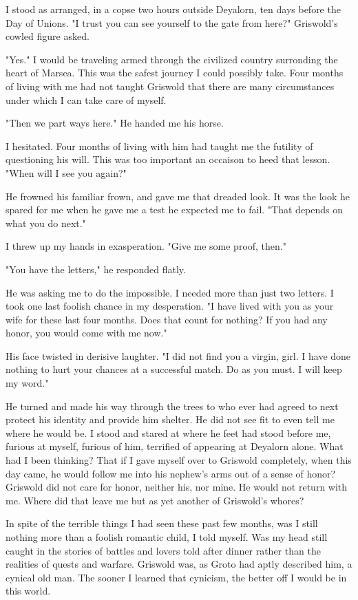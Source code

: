 \documentclass{article}
\begin{document}
I stood as arranged, in a copse two hours outside Deyalorn, ten days before the Day of Unions. "I trust you can see yourself to the gate from here?" Griswold's cowled figure asked.

"Yes." I would be traveling armed through the civilized country surronding the heart of Marsea. This was the safest journey I could possibly take. Four months of living with me had not taught Griswold that there are many circumstances under which I can take care of myself.

"Then we part ways here." He handed me his horse.

I hesitated. Four months of living with him had taught me the futility of questioning his will. This was too important an occaison to heed that lesson. "When will I see you again?"

He frowned his familiar frown, and gave me that dreaded look. It was the look he spared for me when he gave me a test he expected me to fail. "That depends on what you do next."

I threw up my hands in exasperation. "Give me some proof, then."

"You have the letters," he responded flatly.

He was asking me to do the impossible. I needed more than just two letters. I took one last foolish chance in my desperation. "I have lived with you as your wife for these last four months. Does that count for nothing? If you had any honor, you would come with me now."

His face twisted in derisive laughter. "I did not find you a virgin, girl. I have done nothing to hurt your chances at a successful match. Do as you must. I will keep my word."

He turned and made his way through the trees to who ever had agreed to next protect his identity and provide him shelter. He did not see fit to even tell me where he would be. I stood and stared at where he feet had stood before me, furious at myself, furious of him, terrified of appearing at Deyalorn alone. What had I been thinking? That if I gave myself over to Griswold completely, when this day came, he would follow me into his nephew's arms out of a sense of honor? Griswold did not care for honor, neither his, nor mine. He would not return with me. Where did that leave me but as yet another of Griswold's whores? 

In spite of the terrible things I had seen these past few months, was I still nothing more than a foolish romantic child, I told myself. Was my head still caught in the stories of battles and lovers told after dinner rather than the realities of quests and warfare. Griswold was, as Groto had aptly described him, a cynical old man. The sooner I learned that cynicism, the better off I would be in this world.
\end{document}
